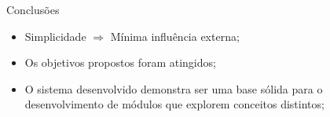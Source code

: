 \begin{frame}{Conclus\~{o}es}
	\begin{itemize}
		\item Simplicidade $\Rightarrow$ M\'{i}nima influ\^{e}ncia externa;
		\item Os objetivos propostos foram atingidos;
		\item O sistema desenvolvido demonstra ser uma base s\'{o}lida para o desenvolvimento de m\'{o}dulos que explorem conceitos distintos;
	\end{itemize}
\end{frame}